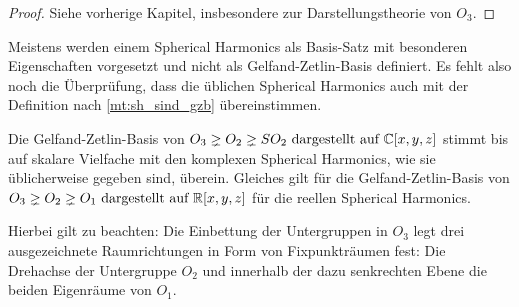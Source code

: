 \begin{proof}
	Siehe vorherige Kapitel, insbesondere zur Darstellungstheorie von $O_3$.
\end{proof}

\begin{remark}
	Meistens werden einem Spherical Harmonics als Basis-Satz mit besonderen Eigenschaften vorgesetzt und nicht als Gelfand-Zetlin-Basis definiert. Es fehlt also noch die Überprüfung, dass die üblichen Spherical Harmonics auch mit der Definition nach \ref{mt:sh_sind_gzb} übereinstimmen.
\end{remark}

\begin{lemma}
	Die Gelfand-Zetlin-Basis von $O_3\gneq O_2\gneq SO_2 \text{ dargestellt auf } \mathbb{C}[x,y,z]$ stimmt bis auf skalare Vielfache mit den komplexen Spherical Harmonics, wie sie üblicherweise gegeben sind, überein. Gleiches gilt für die Gelfand-Zetlin-Basis von $O_3\gneq O_2\gneq O_1 \text{ dargestellt auf } \mathbb{R}[x,y,z]$ für die reellen Spherical Harmonics.

	Hierbei gilt zu beachten: Die Einbettung der Untergruppen in $O_3$ legt drei ausgezeichnete Raumrichtungen in Form von Fixpunkträumen fest: Die Drehachse der Untergruppe $O_2$ und innerhalb der dazu senkrechten Ebene die beiden Eigenräume von $O_1$.
\end{lemma}

